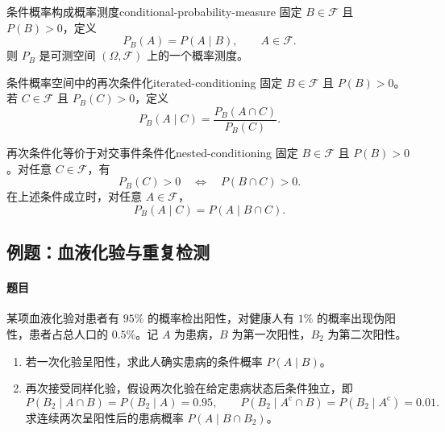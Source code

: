 \begin{mytheorem}{条件概率构成概率测度}{conditional-probability-measure}
固定 $B\in\mathscr{F}$ 且 $P(B)>0$，定义
\[
P_B(A)=P(A\mid B),\qquad A\in\mathscr{F}.
\]
则 $P_B$ 是可测空间 $(\Omega,\mathscr{F})$ 上的一个概率测度。
\end{mytheorem}

\begin{mydefinition}{条件概率空间中的再次条件化}{iterated-conditioning}
固定 $B\in\mathscr{F}$ 且 $P(B)>0$。若 $C\in\mathscr{F}$ 且 $P_B(C)>0$，定义
\[
P_B(A\mid C)=\frac{P_B(A\cap C)}{P_B(C)}.
\]
\end{mydefinition}

\begin{proposition}{再次条件化等价于对交事件条件化}{nested-conditioning}
固定 $B\in\mathscr{F}$ 且 $P(B)>0$。对任意 $C\in\mathscr{F}$，有
\[
P_B(C)>0\quad\Longleftrightarrow\quad P(B\cap C)>0.
\]
在上述条件成立时，对任意 $A\in\mathscr{F}$，
\[
P_B(A\mid C)=P(A\mid B\cap C).
\]
\end{proposition}

\subsection{例题：血液化验与重复检测}\label{note:c1:e21}
\paragraph{题目}
某项血液化验对患者有 $95\%$ 的概率检出阳性，对健康人有 $1\%$ 的概率出现伪阳性，患者占总人口的 $0.5\%$。记 $A$ 为患病，$B$ 为第一次阳性，$B_2$ 为第二次阳性。
\begin{enumerate}
\item 若一次化验呈阳性，求此人确实患病的条件概率 $P(A\mid B)$。
\item 再次接受同样化验，假设两次化验在给定患病状态后条件独立，即
\[P(B_2\mid A\cap B)=P(B_2\mid A)=0.95,\qquad P(B_2\mid A^{\mathrm c}\cap B)=P(B_2\mid A^{\mathrm c})=0.01.\]
求连续两次呈阳性后的患病概率 $P(A\mid B\cap B_2)$。
\end{enumerate}

